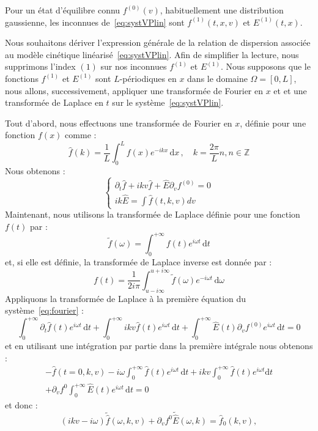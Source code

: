 Pour un état d'équilibre connu $f^{(0)}(v)$, habituellement une distribution gaussienne, les inconnues de~\eqref{eq:systVPlin} sont $f^{(1)}(t,x,v)$ et $E^{(1)}(t,x)$.

Nous souhaitons dériver l'expression générale de la relation de dispersion associée au modèle cinétique linéarisé~\eqref{eq:systVPlin}. Afin de simplifier la lecture, nous supprimons l'index $(1)$ sur nos inconnues $f^{(1)}$ et $E^{(1)}$. Nous supposons que le fonctions $f^{(1)}$ et $E^{(1)}$ sont $L$-périodiques en $x$ dans le domaine $\Omega=[0,L]$, nous allons, successivement, appliquer une transformée de Fourier en $x$ et et une transformée de Laplace en $t$ sur le système~\eqref{eq:systVPlin}.

Tout d'abord, nous effectuons une transformée de Fourier en $x$, définie pour une fonction $f(x)$ comme :
$$
  \hat{f}(k) = \frac{1}{L}\int_0^L f(x)e^{-ikx}\,\mathrm{d}x\,,\quad k=\frac{2\pi}{L}n, n\in\mathbb{Z}
$$
Nous obtenons :
\begin{equation}
  \begin{cases}
    \partial_t \hat{f} + ikv\hat{f} + \hat{E}\partial_v f^{(0)} = 0 \\
    ik\hat{E} = \int \hat{f}(t,k,v) dv
  \end{cases}
  \label{eq:fourier}
\end{equation}
Maintenant, nous utilisons la transformée de Laplace définie pour une fonction $f(t)$ par :
$$
  \tilde{f}(\omega) = \int_0^{+\infty} f(t)e^{i\omega t}\,\mathrm{d}t
$$
et, si elle est définie, la transformée de Laplace inverse est donnée par :
$$
  f(t) = \frac{1}{2i\pi}\int_{u-i\infty}^{u+i\infty} \tilde{f}(\omega)e^{-i\omega t}\,\mathrm{d}\omega
$$
Appliquons la transformée de Laplace à la première équation du système~\eqref{eq:fourier} :
$$
  \int_0^{+\infty}\partial_t\hat{f}(t)e^{i\omega t}\,\mathrm{d}t
  + \int_0^{+\infty}ikv\hat{f}(t)e^{i\omega t}\,\mathrm{d}t
  + \int_0^{+\infty}\hat{E}(t)\partial_v f^{(0)}e^{i\omega t}\,\mathrm{d}t
  = 0
$$
et en utilisant une intégration par partie dans la première intégrale nous obtenons :
$$
  \begin{aligned}
    -\hat{f}(t=0,k,v) - i\omega\int_0^{+\infty} \hat{f}(t)e^{i\omega t}\,\mathrm{d}t + ikv\int_0^{+\infty} \hat{f}(t)e^{i\omega t} \mathrm{d}t \\
    +\partial_vf^0\int_0^{+\infty}\hat{E}(t)e^{i\omega t}\,\mathrm{d}t=0
  \end{aligned}
$$
et donc :
\begin{equation}
  (ikv-i\omega)\tilde{\hat{f}}(\omega,k,v) + \partial_vf^0\tilde{\hat{E}}(\omega,k) = \hat{f}_0(k,v),
  \label{eq:fourierlaplace_f}
\end{equation}
